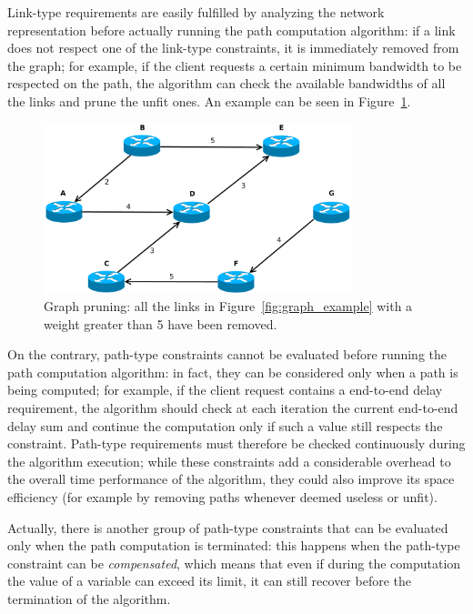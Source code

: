 \documentclass[10pt,a4paper]{report}
\begin{document}
Link-type requirements are easily fulfilled by analyzing the network
representation before actually running the path computation algorithm:
if a link does not respect one of the link-type constraints, it is
immediately removed from the graph; for example, if the client
requests a certain minimum bandwidth to be respected  on the path, the
algorithm can check the available bandwidths of all the links and
prune the unfit ones. An example can be seen in
Figure~\ref{fig:graph_pruning}.

\begin{figure}[!tbp]
  \begin{center}
    \includegraphics[width=0.8\textwidth]{img/graph_pruning}
    \caption[Graph pruning]{Graph pruning: all the links in
      Figure~\ref{fig:graph_example} with a weight greater than 5 have
      been removed.}
    \label{fig:graph_pruning}
  \end{center}
\end{figure}

On the contrary, path-type constraints cannot be evaluated before
running the path computation algorithm: in fact, they can be
considered only when a path is being computed; for example, if the
client request contains a end-to-end delay requirement, the algorithm
should check at each iteration the current end-to-end delay sum and
continue the computation only if such a value still respects the
constraint. Path-type requirements must therefore be checked
continuously during the algorithm execution; while these constraints
add a considerable overhead to the overall time performance of the
algorithm, they could also improve its space efficiency (for example
by removing paths whenever deemed useless or unfit).

Actually, there is another group of path-type constraints that can be
evaluated only when the path computation is terminated: this happens
when the path-type constraint can be \textit{compensated}, which means
that even if during the computation the value of a variable can exceed
its limit, it can still recover before the termination of the
algorithm.
\end{document}
